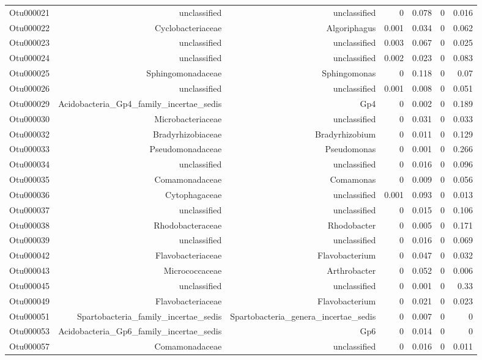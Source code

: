 \begin{table}[ht]
\begin{tabular}{crrrrrr}
  Otu000021 & unclassified & unclassified & 0 & 0.078 & 0 & 0.016 \\ 
  Otu000022 & Cyclobacteriaceae & Algoriphagus & 0.001 & 0.034 & 0 & 0.062 \\ 
  Otu000023 & unclassified & unclassified & 0.003 & 0.067 & 0 & 0.025 \\ 
  Otu000024 & unclassified & unclassified & 0.002 & 0.023 & 0 & 0.083 \\ 
  Otu000025 & Sphingomonadaceae & Sphingomonas & 0 & 0.118 & 0 & 0.07 \\ 
  Otu000026 & unclassified & unclassified & 0.001 & 0.008 & 0 & 0.051 \\ 
  Otu000029 & Acidobacteria\_Gp4\_family\_incertae\_sedis & Gp4 & 0 & 0.002 & 0 & 0.189 \\ 
  Otu000030 & Microbacteriaceae & unclassified & 0 & 0.031 & 0 & 0.033 \\ 
  Otu000032 & Bradyrhizobiaceae & Bradyrhizobium & 0 & 0.011 & 0 & 0.129 \\ 
  Otu000033 & Pseudomonadaceae & Pseudomonas & 0 & 0.001 & 0 & 0.266 \\ 
  Otu000034 & unclassified & unclassified & 0 & 0.016 & 0 & 0.096 \\ 
  Otu000035 & Comamonadaceae & Comamonas & 0 & 0.009 & 0 & 0.056 \\ 
  Otu000036 & Cytophagaceae & unclassified & 0.001 & 0.093 & 0 & 0.013 \\ 
  Otu000037 & unclassified & unclassified & 0 & 0.015 & 0 & 0.106 \\ 
  Otu000038 & Rhodobacteraceae & Rhodobacter & 0 & 0.005 & 0 & 0.171 \\ 
  Otu000039 & unclassified & unclassified & 0 & 0.016 & 0 & 0.069 \\ 
  Otu000042 & Flavobacteriaceae & Flavobacterium & 0 & 0.047 & 0 & 0.032 \\ 
  Otu000043 & Micrococcaceae & Arthrobacter & 0 & 0.052 & 0 & 0.006 \\ 
  Otu000045 & unclassified & unclassified & 0 & 0.001 & 0 & 0.33 \\ 
  Otu000049 & Flavobacteriaceae & Flavobacterium & 0 & 0.021 & 0 & 0.023 \\ 
  Otu000051 & Spartobacteria\_family\_incertae\_sedis & Spartobacteria\_genera\_incertae\_sedis & 0 & 0.007 & 0 & 0 \\ 
  Otu000053 & Acidobacteria\_Gp6\_family\_incertae\_sedis & Gp6 & 0 & 0.014 & 0 & 0 \\ 
  Otu000057 & Comamonadaceae & unclassified & 0 & 0.016 & 0 & 0.011 \\ 

\end{tabular}
\end{table}
